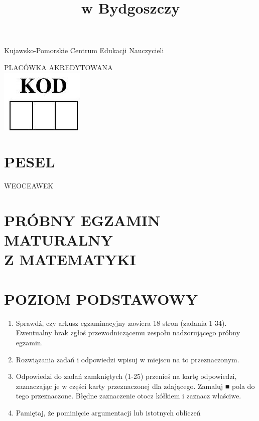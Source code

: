 \documentclass[10pt]{article}
\title{w Bydgoszczy }
\author{}
\date{}
\begin{document}
\maketitle
Kujawsko-Pomorskie Centrum Edukacji Nauczycieli

PLACÓWKA AKREDYTOWANA\\
\includegraphics[max width=\textwidth, center]{2024_11_21_997c30e0b98e62837d84g-01}

\section*{PESEL}
WEOCEAWEK

\section*{PRÓBNY EGZAMIN MATURALNY \\
 Z MATEMATYKI}
\section*{POZIOM PODSTAWOWY}
\begin{enumerate}
  \item Sprawdź, czy arkusz egzaminacyjny zawiera 18 stron (zadania 1-34). Ewentualny brak zgłoś przewodniczącemu zespołu nadzorującego próbny egzamin.
  \item Rozwiązania zadań i odpowiedzi wpisuj w miejscu na to przeznaczonym.
  \item Odpowiedzi do zadań zamkniętych (1-25) przenieś na kartę odpowiedzi, zaznaczając je w części karty przeznaczonej dla zdającego. Zamaluj ■ pola do tego przeznaczone. Błędne zaznaczenie otocz kółkiem i zaznacz właściwe.
  \item Pamiętaj, że pominięcie argumentacji lub istotnych obliczeń
\end{enumerate}
\end{document}
